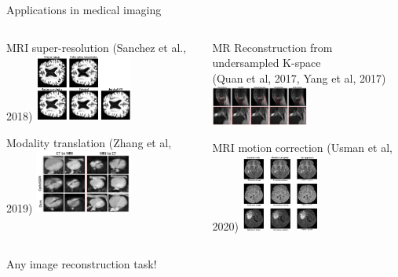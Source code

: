 \documentclass[8pt,xcolor=table,aspectratio=169]{beamer}
\begin{document}
\begin{frame}{Applications in medical imaging}

\begin{columns}
\begin{column}{0.5\textwidth}
\centering
MRI super-resolution (Sanchez et al., 2018)
\includegraphics[width=0.5\textwidth]{X6IAL27.png}

\vspace{2em}

Modality translation (Zhang et al, 2019)
\includegraphics[width=0.5\textwidth]{bJiu3sB.png}


\end{column}
\begin{column}{0.5\textwidth}
\centering
MR Reconstruction from undersampled K-space\\
(Quan et al, 2017, Yang et al, 2017)
\includegraphics[width=0.5\textwidth]{FGjJDse.png}

\vspace{2em}

MRI motion correction (Usman et al, 2020)
\includegraphics[width=0.4\textwidth]{Pp1A5iy.png}


\end{column}
\end{columns}

\begin{center}
Any image reconstruction task!
\end{center}


\end{frame}
\end{document}
